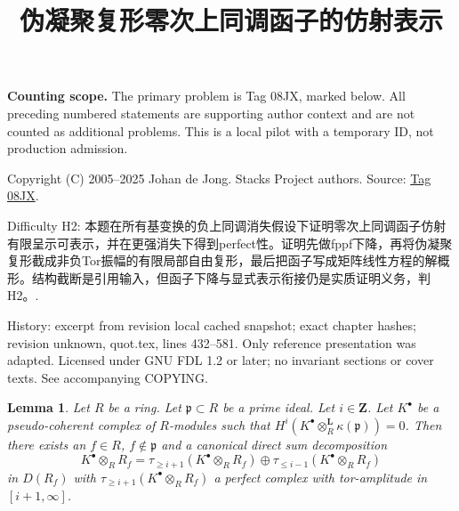 \documentclass{amsart}
\theoremstyle{plain}
\newtheorem{lemma}[subsection]{Lemma}
\theoremstyle{definition}
\theoremstyle{remark}
\numberwithin{equation}{subsection}
\begin{document}
\title[Stacks Project, Tag 08JX]{伪凝聚复形零次上同调函子的仿射表示}
\maketitle
\noindent\textbf{Counting scope.} The primary problem is Tag 08JX, marked below. All preceding numbered statements are supporting author context and are not counted as additional problems. This is a local pilot with a temporary ID, not production admission.


\noindent Copyright (C) 2005--2025 Johan de Jong. Stacks Project authors. Source: \href{https://stacks.math.columbia.edu/tag/08JX}{Tag 08JX}.

\noindent Difficulty H2: 本题在所有基变换的负上同调消失假设下证明零次上同调函子仿射有限呈示可表示，并在更强消失下得到perfect性。证明先做fppf下降，再将伪凝聚复形截成非负Tor振幅的有限局部自由复形，最后把函子写成矩阵线性方程的解概形。结构截断是引用输入，但函子下降与显式表示衔接仍是实质证明义务，判H2。.

\noindent History: excerpt from revision local cached snapshot; exact chapter hashes; revision unknown, quot.tex, lines 432--581. Only reference presentation was adapted. Licensed under GNU FDL 1.2 or later; no invariant sections or cover texts. See accompanying COPYING.

\begin{lemma}
\label{more-algebra-lemma-cut-complex-in-two}
Let $R$ be a ring. Let $\mathfrak p \subset R$ be a prime ideal.
Let $i \in \mathbf{Z}$. Let $K^\bullet$ be a pseudo-coherent complex
of $R$-modules such that
$H^i(K^\bullet \otimes_R^{\mathbf{L}} \kappa(\mathfrak p)) = 0$.
Then there exists an $f \in R$, $f \not \in \mathfrak p$
and a canonical direct sum decomposition
$$
K^\bullet \otimes_R R_f =
\tau_{\geq i + 1}(K^\bullet \otimes_R R_f) \oplus
\tau_{\leq i - 1}(K^\bullet \otimes_R R_f)
$$
in $D(R_f)$ with $\tau_{\geq i + 1}(K^\bullet \otimes_R R_f)$ a perfect
complex with tor-amplitude in $[i + 1, \infty]$.
\end{lemma}
\end{document}
